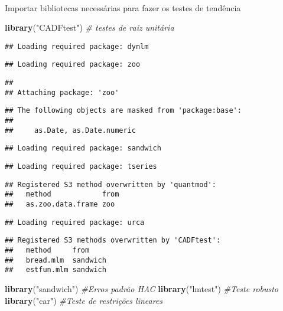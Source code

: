 \documentclass[
]{article}
\newenvironment{Shaded}{\begin{snugshade}}{\end{snugshade}}
\newcommand{\CommentTok}[1]{\textcolor[rgb]{0.56,0.35,0.01}{\textit{#1}}}
\newcommand{\FunctionTok}[1]{\textcolor[rgb]{0.13,0.29,0.53}{\textbf{#1}}}
\newcommand{\NormalTok}[1]{#1}
\newcommand{\StringTok}[1]{\textcolor[rgb]{0.31,0.60,0.02}{#1}}
\begin{document}
~

Importar bibliotecas necessárias para fazer os testes de tendência

\begin{Shaded}
\begin{Highlighting}[]
\FunctionTok{library}\NormalTok{(}\StringTok{"CADFtest"}\NormalTok{) }\CommentTok{\# testes de raiz unitária}
\end{Highlighting}
\end{Shaded}

\begin{verbatim}
## Loading required package: dynlm
\end{verbatim}

\begin{verbatim}
## Loading required package: zoo
\end{verbatim}

\begin{verbatim}
## 
## Attaching package: 'zoo'
\end{verbatim}

\begin{verbatim}
## The following objects are masked from 'package:base':
## 
##     as.Date, as.Date.numeric
\end{verbatim}

\begin{verbatim}
## Loading required package: sandwich
\end{verbatim}

\begin{verbatim}
## Loading required package: tseries
\end{verbatim}

\begin{verbatim}
## Registered S3 method overwritten by 'quantmod':
##   method            from
##   as.zoo.data.frame zoo
\end{verbatim}

\begin{verbatim}
## Loading required package: urca
\end{verbatim}

\begin{verbatim}
## Registered S3 methods overwritten by 'CADFtest':
##   method     from    
##   bread.mlm  sandwich
##   estfun.mlm sandwich
\end{verbatim}

\begin{Shaded}
\begin{Highlighting}[]
\FunctionTok{library}\NormalTok{(}\StringTok{"sandwich"}\NormalTok{) }\CommentTok{\#Erros padrão HAC}
\FunctionTok{library}\NormalTok{(}\StringTok{"lmtest"}\NormalTok{) }\CommentTok{\#Teste robusto}
\FunctionTok{library}\NormalTok{(}\StringTok{"car"}\NormalTok{) }\CommentTok{\#Teste de restrições lineares}
\end{Highlighting}
\end{Shaded}
\end{document}
